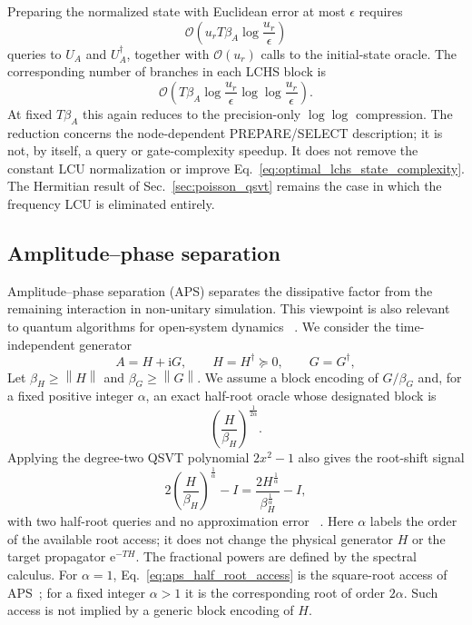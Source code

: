 \documentclass[aps,pra,reprint,floatfix,unsortedaddress,superscriptaddress]{revtex4-2}
\newcommand{\norm}[1]{\left\lVert#1\right\rVert}
\newcommand{\Ocal}{\mathcal{O}}
\begin{document}
Preparing the normalized state with Euclidean error at most $\epsilon$
requires
\begin{equation}
    \Ocal\!\left(
        u_rT\beta_A\log\frac{u_r}{\epsilon}
    \right)
    \label{eq:optimal_lchs_state_complexity}
\end{equation}
queries to $U_A$ and $U_A^\dagger$, together with $\Ocal(u_r)$ calls
to the initial-state oracle.  The corresponding number of branches in
each LCHS block is
\begin{equation}
    \Ocal\!\left(
        T\beta_A
        \log\frac{u_r}{\epsilon}
        \log\log\frac{u_r}{\epsilon}
    \right).
    \label{eq:sinh_lchs_state_branches}
\end{equation}
At fixed $T\beta_A$ this again reduces to the precision-only
$\log\log$ compression.  The reduction concerns the node-dependent
    PREPARE/SELECT
description; it is not, by itself, a query or gate-complexity speedup.
It does not remove the constant LCU normalization or improve
Eq.~\eqref{eq:optimal_lchs_state_complexity}.  The Hermitian result of
Sec.~\ref{sec:poisson_qsvt} remains the case in which the frequency LCU
is eliminated entirely.

\subsection{Amplitude--phase separation}
\label{subsec:aps}

Amplitude--phase separation (APS) separates the dissipative factor from
the remaining interaction in non-unitary simulation.  This viewpoint is
also relevant to quantum algorithms for open-system dynamics
~\cite{RevModPhys.93.015008,Liu2025simulationofopen,
delgado2025quantum}.  We consider the time-independent generator
\begin{equation}
    A=H+\mathrm iG,
    \qquad H=H^\dagger\succeq0,
    \qquad G=G^\dagger,
    \label{eq:aps_generator}
\end{equation}
Let $\beta_H\geq\norm{H}$ and $\beta_G\geq\norm{G}$.  We assume a
block encoding of $G/\beta_G$ and, for a fixed positive integer
$\alpha$, an exact half-root oracle whose designated block is
\begin{equation}
    \left(\frac{H}{\beta_H}\right)^{\frac{1}{2\alpha}}.
    \label{eq:aps_half_root_access}
\end{equation}
Applying the degree-two QSVT polynomial $2x^2-1$ also gives the
root-shift signal
\begin{equation}
    2\left(\frac{H}{\beta_H}\right)^{\frac{1}{\alpha}}-I
    =
    \frac{2H^{\frac{1}{\alpha}}}{\beta_H^{\frac{1}{\alpha}}}-I,
    \label{eq:aps_root_signal}
\end{equation}
with two half-root queries and no approximation error
~\cite{Gilyen2019qsvt}.  Here $\alpha$ labels the order of the available
root access; it does not change the physical generator $H$ or the target
propagator $\mathrm e^{-TH}$.  The fractional powers are defined by the
spectral calculus.  For $\alpha=1$,
Eq.~\eqref{eq:aps_half_root_access} is the square-root access of
APS~\cite{hu2026quantumsimulationnonunitarydynamics}; for a fixed integer
$\alpha>1$ it is the corresponding root of order $2\alpha$.  Such access
is not implied by a generic block encoding of $H$.
\end{document}
